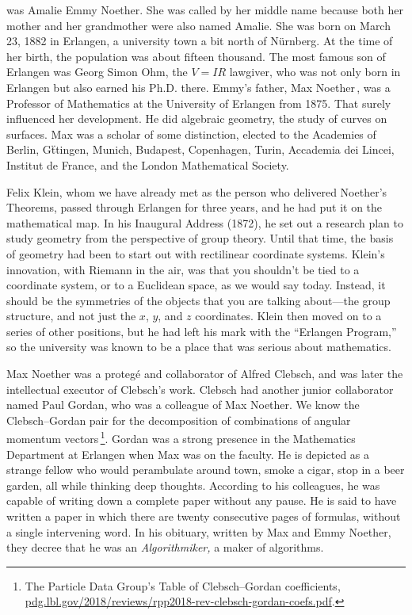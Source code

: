 \documentclass[twoside,symmetric]{tufte-handout}
\begin{document}

 was Amalie Emmy Noether. She was called by her middle name because both her mother and her grandmother were also named Amalie. She was born on March 23, 1882 in Erlangen, a university town a bit north of N\"urnberg. At the time of her birth, the population was about fifteen thousand. The most famous son of Erlangen was Georg Simon Ohm, the $V=IR$ lawgiver, who was not only born in Erlangen but also earned his Ph.D. there. Emmy's father, Max Noether$\,$\cite{MaxLebenWerk}, was a Professor of Mathematics at the University of Erlangen from 1875. That surely influenced her development. He did algebraic geometry, the study of curves on surfaces. Max was a scholar of some distinction, elected to the Academies of Berlin, G\"ttingen, Munich, Budapest, Copenhagen, Turin, Accademia dei Lincei, Institut de France, and the London Mathematical Society.

Felix Klein, whom we have already met as the person who delivered Noether's Theorems, passed through Erlangen for three years, and he had put it on the mathematical map. In his Inaugural Address (1872), he set out a research plan to study geometry from the perspective of group theory. Until that time, the basis of geometry had been to start out with rectilinear coordinate systems. Klein's innovation, with Riemann in the air, was that you shouldn't be tied to a coordinate system, or to a Euclidean space, as we would say today. Instead, it should be the symmetries of the objects that you are talking about---the group structure, and not just the $x$, $y$, and $z$ coordinates. Klein then moved on to a series of other positions, but he had left his mark with the ``Erlangen Program,''$\,$\cite[-57pt]{10.5749/j.cttttp0k.9} so the university was known to be a place that was serious about mathematics.

Max Noether was a proteg\'e and collaborator of Alfred Clebsch, and was later the intellectual executor of Clebsch's work. Clebsch had another junior collaborator named Paul Gordan, who was a colleague of Max Noether. We know the Clebsch--Gordan pair for the decomposition of combinations of angular momentum vectors$\,$\footnote{The Particle Data Group's Table of Clebsch--Gordan coefficients, \url{pdg.lbl.gov/2018/reviews/rpp2018-rev-clebsch-gordan-coefs.pdf}.}. %
Gordan was a strong presence in the Mathematics Department at Erlangen when Max was on the faculty. He is depicted as a strange fellow who would perambulate around town, smoke a cigar, stop in a beer garden, all while thinking deep thoughts. According to his colleagues, he was capable of writing down a complete paper without any pause. He is said to have written a paper in which there are twenty consecutive pages of formulas, without a single intervening word. In his obituary, written by Max and Emmy Noether, they decree that he was an \emph{Algorithmiker,} a maker of algorithms.
\end{document}
